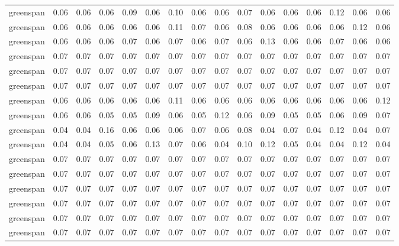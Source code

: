 \begin{tabular}{lrrrrrrrrrrrrrrr}
 greenspan & 0.06 & 0.06 & 0.06 & 0.09 & 0.06 & 0.10 & 0.06 & 0.06 & 0.07 &  0.06 &  0.06 &  0.06 &  0.12 &  0.06 &  0.06 \\
 greenspan & 0.06 & 0.06 & 0.06 & 0.06 & 0.06 & 0.11 & 0.07 & 0.06 & 0.08 &  0.06 &  0.06 &  0.06 &  0.06 &  0.12 &  0.06 \\
 greenspan & 0.06 & 0.06 & 0.06 & 0.07 & 0.06 & 0.07 & 0.06 & 0.07 & 0.06 &  0.13 &  0.06 &  0.06 &  0.07 &  0.06 &  0.06 \\
 greenspan & 0.07 & 0.07 & 0.07 & 0.07 & 0.07 & 0.07 & 0.07 & 0.07 & 0.07 &  0.07 &  0.07 &  0.07 &  0.07 &  0.07 &  0.07 \\
 greenspan & 0.07 & 0.07 & 0.07 & 0.07 & 0.07 & 0.07 & 0.07 & 0.07 & 0.07 &  0.07 &  0.07 &  0.07 &  0.07 &  0.07 &  0.07 \\
 greenspan & 0.07 & 0.07 & 0.07 & 0.07 & 0.07 & 0.07 & 0.07 & 0.07 & 0.07 &  0.07 &  0.07 &  0.07 &  0.07 &  0.07 &  0.07 \\
 greenspan & 0.06 & 0.06 & 0.06 & 0.06 & 0.06 & 0.11 & 0.06 & 0.06 & 0.06 &  0.06 &  0.06 &  0.06 &  0.06 &  0.06 &  0.12 \\
 greenspan & 0.06 & 0.06 & 0.05 & 0.05 & 0.09 & 0.06 & 0.05 & 0.12 & 0.06 &  0.09 &  0.05 &  0.05 &  0.06 &  0.09 &  0.07 \\
 greenspan & 0.04 & 0.04 & 0.16 & 0.06 & 0.06 & 0.06 & 0.07 & 0.06 & 0.08 &  0.04 &  0.07 &  0.04 &  0.12 &  0.04 &  0.07 \\
 greenspan & 0.04 & 0.04 & 0.05 & 0.06 & 0.13 & 0.07 & 0.06 & 0.04 & 0.10 &  0.12 &  0.05 &  0.04 &  0.04 &  0.12 &  0.04 \\
 greenspan & 0.07 & 0.07 & 0.07 & 0.07 & 0.07 & 0.07 & 0.07 & 0.07 & 0.07 &  0.07 &  0.07 &  0.07 &  0.07 &  0.07 &  0.07 \\
 greenspan & 0.07 & 0.07 & 0.07 & 0.07 & 0.07 & 0.07 & 0.07 & 0.07 & 0.07 &  0.07 &  0.07 &  0.07 &  0.07 &  0.07 &  0.07 \\
 greenspan & 0.07 & 0.07 & 0.07 & 0.07 & 0.07 & 0.07 & 0.07 & 0.07 & 0.07 &  0.07 &  0.07 &  0.07 &  0.07 &  0.07 &  0.07 \\
 greenspan & 0.07 & 0.07 & 0.07 & 0.07 & 0.07 & 0.07 & 0.07 & 0.07 & 0.07 &  0.07 &  0.07 &  0.07 &  0.07 &  0.07 &  0.07 \\
 greenspan & 0.07 & 0.07 & 0.07 & 0.07 & 0.07 & 0.07 & 0.07 & 0.07 & 0.07 &  0.07 &  0.07 &  0.07 &  0.07 &  0.07 &  0.07 \\
 greenspan & 0.07 & 0.07 & 0.07 & 0.07 & 0.07 & 0.07 & 0.07 & 0.07 & 0.07 &  0.07 &  0.07 &  0.07 &  0.07 &  0.07 &  0.07 \\

\end{tabular}
